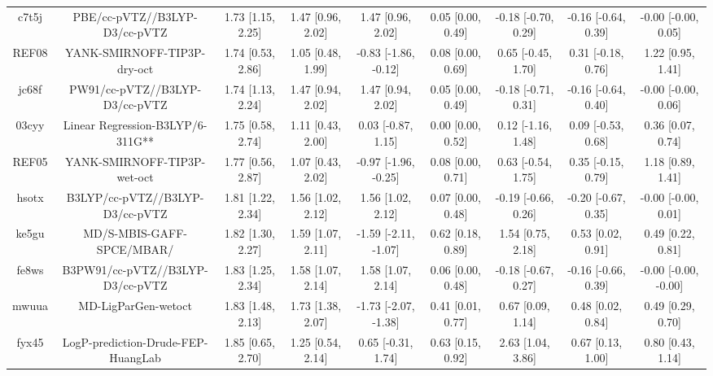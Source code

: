 \documentclass{article}
\begin{document}
\begin{center}
\begin{longtable}{|ccccccccc|}
 c7t5j &                      PBE/cc-pVTZ//B3LYP-D3/cc-pVTZ &  1.73 [1.15, 2.25] &  1.47 [0.96, 2.02] &     1.47 [0.96, 2.02] &  0.05 [0.00, 0.49] &  -0.18 [-0.70, 0.29] &  -0.16 [-0.64, 0.39] &   -0.00 [-0.00, 0.05] \\
 REF08 &                        YANK-SMIRNOFF-TIP3P-dry-oct &  1.74 [0.53, 2.86] &  1.05 [0.48, 1.99] &  -0.83 [-1.86, -0.12] &  0.08 [0.00, 0.69] &   0.65 [-0.45, 1.70] &   0.31 [-0.18, 0.76] &     1.22 [0.95, 1.41] \\
 jc68f &                     PW91/cc-pVTZ//B3LYP-D3/cc-pVTZ &  1.74 [1.13, 2.24] &  1.47 [0.94, 2.02] &     1.47 [0.94, 2.02] &  0.05 [0.00, 0.49] &  -0.18 [-0.71, 0.31] &  -0.16 [-0.64, 0.40] &   -0.00 [-0.00, 0.06] \\
 03cyy &                   Linear Regression-B3LYP/6-311G** &  1.75 [0.58, 2.74] &  1.11 [0.43, 2.00] &    0.03 [-0.87, 1.15] &  0.00 [0.00, 0.52] &   0.12 [-1.16, 1.48] &   0.09 [-0.53, 0.68] &     0.36 [0.07, 0.74] \\
 REF05 &                        YANK-SMIRNOFF-TIP3P-wet-oct &  1.77 [0.56, 2.87] &  1.07 [0.43, 2.02] &  -0.97 [-1.96, -0.25] &  0.08 [0.00, 0.71] &   0.63 [-0.54, 1.75] &   0.35 [-0.15, 0.79] &     1.18 [0.89, 1.41] \\
 hsotx &                    B3LYP/cc-pVTZ//B3LYP-D3/cc-pVTZ &  1.81 [1.22, 2.34] &  1.56 [1.02, 2.12] &     1.56 [1.02, 2.12] &  0.07 [0.00, 0.48] &  -0.19 [-0.66, 0.26] &  -0.20 [-0.67, 0.35] &   -0.00 [-0.00, 0.01] \\
 ke5gu &                          MD/S-MBIS-GAFF-SPCE/MBAR/ &  1.82 [1.30, 2.27] &  1.59 [1.07, 2.11] &  -1.59 [-2.11, -1.07] &  0.62 [0.18, 0.89] &    1.54 [0.75, 2.18] &    0.53 [0.02, 0.91] &     0.49 [0.22, 0.81] \\
 fe8ws &                   B3PW91/cc-pVTZ//B3LYP-D3/cc-pVTZ &  1.83 [1.25, 2.34] &  1.58 [1.07, 2.14] &     1.58 [1.07, 2.14] &  0.06 [0.00, 0.48] &  -0.18 [-0.67, 0.27] &  -0.16 [-0.66, 0.39] &  -0.00 [-0.00, -0.00] \\
 mwuua &                                MD-LigParGen-wetoct &  1.83 [1.48, 2.13] &  1.73 [1.38, 2.07] &  -1.73 [-2.07, -1.38] &  0.41 [0.01, 0.77] &    0.67 [0.09, 1.14] &    0.48 [0.02, 0.84] &     0.49 [0.29, 0.70] \\
 fyx45 &                 LogP-prediction-Drude-FEP-HuangLab &  1.85 [0.65, 2.70] &  1.25 [0.54, 2.14] &    0.65 [-0.31, 1.74] &  0.63 [0.15, 0.92] &    2.63 [1.04, 3.86] &    0.67 [0.13, 1.00] &     0.80 [0.43, 1.14] \\

\end{longtable}
\end{center}
\end{document}
